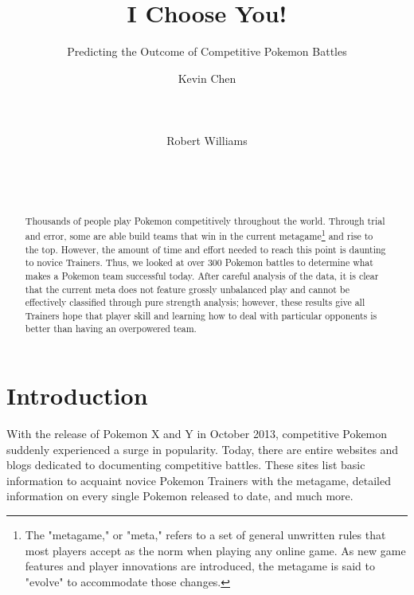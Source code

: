 \documentclass{acm_proc_article-sp}
\begin{document}
\title{I Choose You!}
\subtitle{Predicting the Outcome of Competitive Pokemon Battles}


\author{
\alignauthor
Kevin Chen\\
       \\
       \\
       \\
\alignauthor
Robert Williams\\
       \\
       \\
       \\
}

\maketitle
\begin{abstract}
Thousands of people play Pokemon competitively throughout the world. Through trial and error, some are able build teams that win in the current metagame\footnote{The "metagame," or "meta," refers to a set of general unwritten rules that most players accept as the norm when playing any online game. As new game features and player innovations are introduced, the metagame is said to "evolve" to accommodate those changes.} and rise to the top. However, the amount of time and effort needed to reach this point is daunting to novice Trainers. Thus, we looked at over 300 Pokemon battles to determine what makes a Pokemon team successful today. After careful analysis of the data, it is clear that the current meta does not feature grossly unbalanced play and cannot be effectively classified through pure strength analysis; however, these results give all Trainers hope that player skill and learning how to deal with particular opponents is better than having an overpowered team.
\end{abstract}


\section{Introduction}
With the release of Pokemon X and Y in October 2013, competitive Pokemon suddenly experienced a surge in popularity. Today, there are entire websites and blogs dedicated to documenting competitive battles. These sites list basic information to acquaint novice Pokemon Trainers with the metagame, detailed information on every single Pokemon released to date, and much more.
\end{document}

